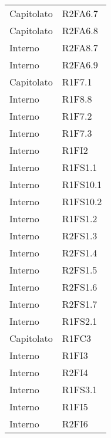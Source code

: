 {\begin{longtable}{ C{4cm} C{4cm}}
Capitolato & R2FA6.7\\

Capitolato & R2FA6.8\\


Interno & R2FA8.7\\

Interno & R2FA6.9\\

Capitolato & R1F7.1\\

Interno & R1F8.8\\

Interno & R1F7.2\\

Interno & R1F7.3\\

Interno & R1FI2\\

Interno & R1FS1.1\\

Interno & R1FS10.1\\


Interno & R1FS10.2\\

Interno & R1FS1.2\\

Interno & R2FS1.3\\

Interno & R2FS1.4\\

Interno & R2FS1.5\\

Interno & R2FS1.6\\

Interno & R2FS1.7\\

Interno & R1FS2.1\\

Capitolato & R1FC3\\

Interno & R1FI3\\

Interno & R2FI4\\

Interno & R1FS3.1\\

Interno & R1FI5\\

Interno & R2FI6\\


\end{longtable}}
